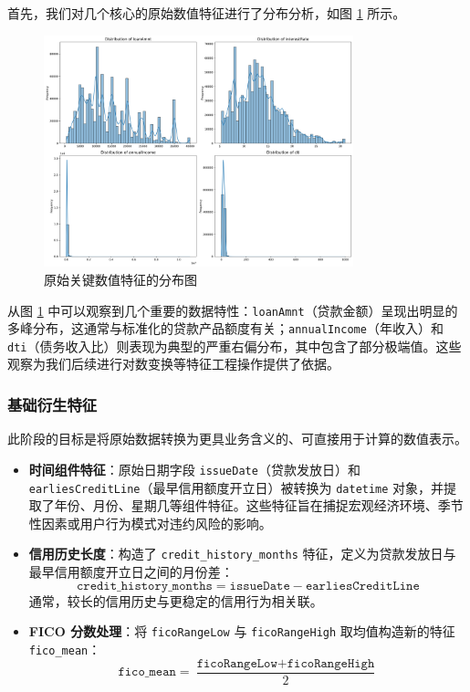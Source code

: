 \documentclass{thuemp}
\begin{document}
首先，我们对几个核心的原始数值特征进行了分布分析，如图 \ref{fig:original_dist} 所示。

\begin{figure}[H]
    \centering
    \includegraphics[width=0.8\textwidth]{image/results/images/major_Distribution.png} %
    \caption{原始关键数值特征的分布图}
    \label{fig:original_dist}
\end{figure}

从图 \ref{fig:original_dist} 中可以观察到几个重要的数据特性：\texttt{loanAmnt}（贷款金额）呈现出明显的多峰分布，这通常与标准化的贷款产品额度有关；\texttt{annualIncome}（年收入）和 \texttt{dti}（债务收入比）则表现为典型的严重右偏分布，其中包含了部分极端值。这些观察为我们后续进行对数变换等特征工程操作提供了依据。

\subsubsection{\textbf{基础衍生特征}}

此阶段的目标是将原始数据转换为更具业务含义的、可直接用于计算的数值表示。

\begin{itemize}
    \item \textbf{时间组件特征}：原始日期字段 \texttt{issueDate}（贷款发放日）和 \texttt{earliesCreditLine}（最早信用额度开立日）被转换为 \texttt{datetime} 对象，并提取了年份、月份、星期几等组件特征。这些特征旨在捕捉宏观经济环境、季节性因素或用户行为模式对违约风险的影响。
    \item \textbf{信用历史长度}：构造了 \texttt{credit\_history\_months} 特征，定义为贷款发放日与最早信用额度开立日之间的月份差：
    \[
    \texttt{credit\_history\_months} = \texttt{issueDate} - \texttt{earliesCreditLine}
    \]
    通常，较长的信用历史与更稳定的信用行为相关联。
    \item \textbf{FICO 分数处理}：将 \texttt{ficoRangeLow} 与 \texttt{ficoRangeHigh} 取均值构造新的特征 \texttt{fico\_mean}：
    \[
    \texttt{fico\_mean} = \frac{\texttt{ficoRangeLow} + \texttt{ficoRangeHigh}}{2}
    \]
\end{itemize}
\end{document}
